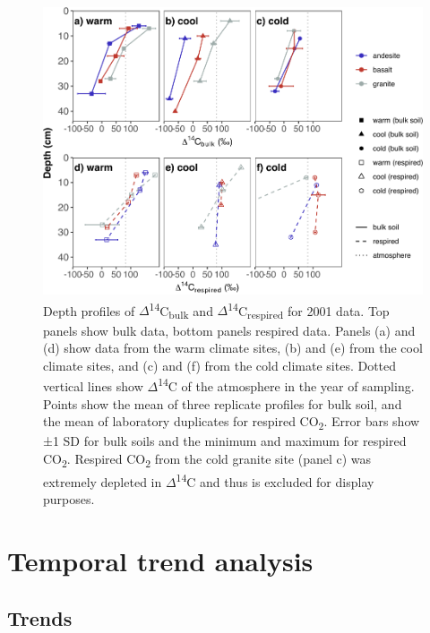 \documentclass[english,man,floatsintext]{apa6}
\begin{document}
\begin{figure}

{\centering \includegraphics{sra-blk-inc-SI_files/figure-latex/plot-d14c-pro-01-1} 

}

\caption{Depth profiles of \(\Delta\)\textsuperscript{14}C\textsubscript{bulk} and \(\Delta\)\textsuperscript{14}C\textsubscript{respired} for 2001 data. Top panels show bulk data, bottom panels respired data. Panels (a) and (d) show data from the warm climate sites, (b) and (e) from the cool climate sites, and (c) and (f) from the cold climate sites. Dotted vertical lines show \(\Delta\)\textsuperscript{14}C of the atmosphere in the year of sampling. Points show the mean of three replicate profiles for bulk soil, and the mean of laboratory duplicates for respired CO\textsubscript{2}. Error bars show ±1 SD for bulk soils and the minimum and maximum for respired CO\textsubscript{2}. Respired CO\textsubscript{2} from the cold granite site (panel c) was extremely depleted in \(\Delta\)\textsuperscript{14}C and thus is excluded for display purposes.}\label{fig:plot-d14c-pro-01}
\end{figure}

\hypertarget{temporal-trend-analysis}{%
\section{Temporal trend analysis}\label{temporal-trend-analysis}}

\hypertarget{trends}{%
\subsection{Trends}\label{trends}}
\end{document}
